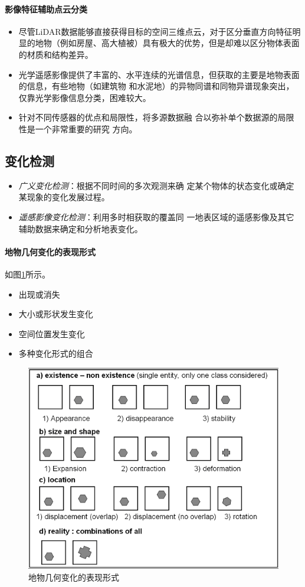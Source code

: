 \paragraph{影像特征辅助点云分类}
\begin{itemize}
	\item 尽管LiDAR数据能够直接获得目标的空间三维点云，对于区分垂直方向特征明显的地物（例如房屋、高大植被）具有极大的优势，但是却难以区分物体表面的材质和结构差异。
	\item 光学遥感影像提供了丰富的、水平连续的光谱信息，但获取的主要是地物表面的信息，有些地物（如建筑物
	和水泥地）的异物同谱和同物异谱现象突出，仅靠光学影像信息分类，困难较大。
	\item 针对不同传感器的优点和局限性，将多源数据融
	合以弥补单个数据源的局限性是一个非常重要的研究
	方向。
\end{itemize}

\subsection{变化检测}

\begin{itemize}
	\item \textit{广义变化检测}：根据不同时间的多次观测来确
		定某个物体的状态变化或确定某现象的变化发展过程。
	\item \textit{遥感影像变化检测}：利用多时相获取的覆盖同
		一地表区域的遥感影像及其它辅助数据来确定和分析地表变化。
\end{itemize}

\paragraph{地物几何变化的表现形式}如图\ref{fig:地物几何变化的表现形式}所示。
\begin{itemize}
	\item 出现或消失
	\item 大小或形状发生变化
	\item 空间位置发生变化
	\item 多种变化形式的组合
\end{itemize}

\begin{figure}
	\centering
	\includegraphics[width=0.7\linewidth]{figure/Chapter6/地物几何变化的表现形式}
	\caption{地物几何变化的表现形式}
	\label{fig:地物几何变化的表现形式}
\end{figure}

